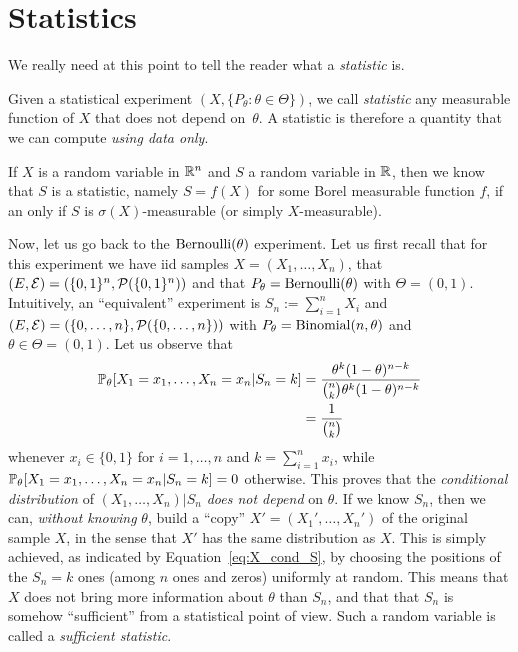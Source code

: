 \section{Statistics}
\label{sec:statistics}

We really need at this point to tell the reader what a \emph{statistic} is.%
\begin{definition}
	Given a statistical experiment $(X, \{ P_\theta : \theta \in \Theta \})$, we call \emph{statistic} any measurable function of $X$ that does not depend on~$\theta$.
	A statistic is therefore a quantity that we can compute \emph{using data only}.
\end{definition}
If $X$ is a random variable in $\R^n$ and $S$ a random variable in $\R$, then we know that $S$ is a statistic, namely $S = f(X)$ for some Borel measurable function $f$, if an only if $S$ is $\sigma(X)$-measurable (or simply $X$-measurable).

Now, let us go back to the $\ber(\theta)$ experiment.
Let us first recall that for this experiment we have iid samples $X = (X_1, \ldots, X_n)$, that
$(E, \cE) = (\{0, 1\}^n, \cP(\{0, 1\}^n))$ and that $P_\theta = \ber(\theta)$ with $\Theta = (0, 1)$.
Intuitively, an ``equivalent'' experiment is $S_n := \sum_{i=1}^n X_i$ and $(E, \cE) = (\{ 0, \ldots, n\}, \cP(\{0, \ldots, n\}))$ with $P_\theta = \bin(n, \theta)$ and $\theta \in \Theta = (0, 1)$.
Let us observe that
\begin{equation}
	\label{eq:X_cond_S}
	\begin{split}
	\P_\theta [X_1 = x_1, \ldots, X_n = x_n | S_n = k] &= 
	\frac{\theta^k (1 - \theta)^{n-k}}{\binom{n}{k} \theta^k (1 - \theta)^{n-k}} \\
	&= \frac{1}{\binom{n}{k}}		
	\end{split}
\end{equation}
whenever $x_i \in \{ 0, 1 \}$ for $i=1, \ldots, n$ and $k = \sum_{i=1}^n x_i$, while $\P_\theta [X_1 = x_1, \ldots, X_n = x_n | S_n = k] = 0$ otherwise.
This proves that the \emph{conditional distribution} of $(X_1, \ldots, X_n) | S_n$ \emph{does not depend} on $\theta$.
If we know $S_n$, then we can, \emph{without knowing} $\theta$, build a ``copy'' $X' = (X_1', \ldots, X_n')$ of the original sample $X$, in the sense that $X'$ has the same distribution as $X$.
This is simply achieved, as indicated by Equation~\eqref{eq:X_cond_S}, by choosing the positions of the $S_n = k$ ones (among $n$ ones and zeros) uniformly at random.
This means that $X$ does not bring more information about $\theta$ than $S_n$, and that that $S_n$ is somehow ``sufficient'' from a statistical point of view.
Such a random variable is called a \emph{sufficient statistic}.


